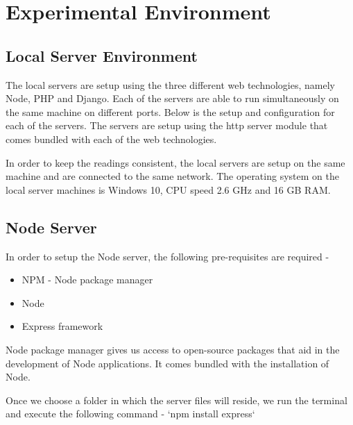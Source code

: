 \documentclass[../thesis.tex]{subfiles}
\begin{document}
	\section{Experimental Environment}
	\subsection{Local Server Environment}
	The local servers are setup using the three different web technologies, namely Node, PHP and Django. Each of the servers are able to run simultaneously on the same machine on different ports. Below is the setup and configuration for each of the servers. The servers are setup using the http server module that comes bundled with each of the web technologies. 
	\newline
	
	In order to keep the readings consistent, the local servers are setup on the same machine and are connected to the same network. The operating system on the local server machines is Windows 10, CPU speed 2.6 GHz and 16 GB RAM.
	\subsection*{Node Server}
	In order to setup the Node server, the following pre-requisites are required - 

	\begin{itemize}
		\item NPM - Node package manager
		\item Node
		\item Express framework
	\end{itemize}

	Node package manager gives us access to open-source packages that aid in the development of Node applications. It comes bundled with the installation of Node.
	\newline

	Once we choose a folder in which the server files will reside, we run the terminal and execute the following command - `npm install express`
	\newline
\end{document}
